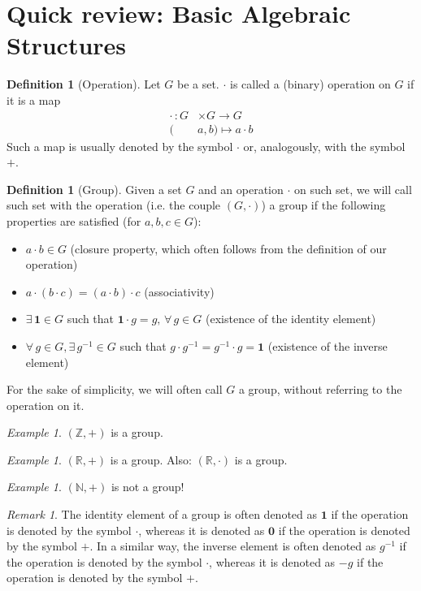 \documentclass[a4paper,11pt,titlepage]{article}
\numberwithin{equation}{section}
\theoremstyle{definition}
\newtheorem{definition}[theorem]{Definition}
\theoremstyle{remark}
\newtheorem{remark}[theorem]{Remark}
\newtheorem{example}[theorem]{Example}
\begin{document}
\section{Quick review: Basic Algebraic Structures}

\begin{definition} [Operation]
Let $G$ be a set. $\cdot$ is called a (binary) operation on $G$ if it is a map
\begin{align*}
\cdot \, \colon G &\times G \longrightarrow G \\
(&a, b) \longmapsto a \cdot b
\end{align*}
Such a map is usually denoted by the symbol $\cdot$ or, analogously, with the symbol $+$.
\end{definition}

\begin{definition} [Group] Given a set $G$ and an operation $\cdot$ on such set, we will call such set with the operation  (i.e. the couple $(G, \cdot)$) a group if the following properties are satisfied (for $a, b, c \in G$):
\begin{itemize}
\item $ a \cdot b \in G$ (closure property, which often follows from the definition of our operation)
\item $a \cdot (b \cdot c) = (a \cdot b) \cdot c$ (associativity)
\item $\exists\, \mathbf{1} \in G$ such that $\mathbf{1} \cdot g = g, \, \forall\, g \in G$ (existence of the identity element)
\item $\forall\, g \in G, \exists\, g^{-1} \in G$ such that $g \cdot g^{-1} = g^{-1} \cdot g = \mathbf{1}$ (existence of the inverse element)
\end{itemize}
For the sake of simplicity, we will often call $G$ a group, without referring to the operation on it.
\end{definition}

\begin{example}
$(\mathbb{Z}, +)$ is a group.
\end{example}

\begin{example}
$(\mathbb{R}, +)$ is a group. Also: $(\mathbb{R}, \cdot)$ is a group.
\end{example}

\begin{example}
$(\mathbb{N}, +)$ is not a group!
\end{example}

\begin{remark}
The identity element of a group is often denoted as $\mathbf{1}$ if the operation is denoted by the symbol $\cdot$, whereas it is denoted as $\mathbf{0}$ if the operation is denoted by the symbol $+$.
In a similar way, the inverse element is often denoted as $g^{-1}$ if the operation is denoted by the symbol $\cdot$, whereas it is denoted as $-g$ if the operation is denoted by the symbol $+$.

\end{remark}
\end{document}
